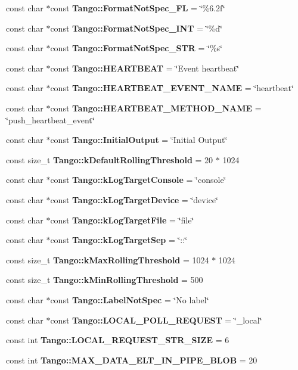 \begin{DoxyCompactItemize}
\item 
const char $\ast$const {\bf Tango\-::\-Format\-Not\-Spec\-\_\-\-F\-L} = \char`\"{}\%6.\-2f\char`\"{}
\item 
const char $\ast$const {\bf Tango\-::\-Format\-Not\-Spec\-\_\-\-I\-N\-T} = \char`\"{}\%d\char`\"{}
\item 
const char $\ast$const {\bf Tango\-::\-Format\-Not\-Spec\-\_\-\-S\-T\-R} = \char`\"{}\%s\char`\"{}
\item 
const char $\ast$const {\bf Tango\-::\-H\-E\-A\-R\-T\-B\-E\-A\-T} = \char`\"{}Event heartbeat\char`\"{}
\item 
const char $\ast$const {\bf Tango\-::\-H\-E\-A\-R\-T\-B\-E\-A\-T\-\_\-\-E\-V\-E\-N\-T\-\_\-\-N\-A\-M\-E} = \char`\"{}heartbeat\char`\"{}
\item 
const char $\ast$const {\bf Tango\-::\-H\-E\-A\-R\-T\-B\-E\-A\-T\-\_\-\-M\-E\-T\-H\-O\-D\-\_\-\-N\-A\-M\-E} = \char`\"{}push\-\_\-heartbeat\-\_\-event\char`\"{}
\item 
const char $\ast$const {\bf Tango\-::\-Initial\-Output} = \char`\"{}Initial Output\char`\"{}
\item 
const size\-\_\-t {\bf Tango\-::k\-Default\-Rolling\-Threshold} = 20 $\ast$ 1024
\item 
const char $\ast$const {\bf Tango\-::k\-Log\-Target\-Console} = \char`\"{}console\char`\"{}
\item 
const char $\ast$const {\bf Tango\-::k\-Log\-Target\-Device} = \char`\"{}device\char`\"{}
\item 
const char $\ast$const {\bf Tango\-::k\-Log\-Target\-File} = \char`\"{}file\char`\"{}
\item 
const char $\ast$const {\bf Tango\-::k\-Log\-Target\-Sep} = \char`\"{}\-::\char`\"{}
\item 
const size\-\_\-t {\bf Tango\-::k\-Max\-Rolling\-Threshold} = 1024 $\ast$ 1024
\item 
const size\-\_\-t {\bf Tango\-::k\-Min\-Rolling\-Threshold} = 500
\item 
const char $\ast$const {\bf Tango\-::\-Label\-Not\-Spec} = \char`\"{}No label\char`\"{}
\item 
const char $\ast$const {\bf Tango\-::\-L\-O\-C\-A\-L\-\_\-\-P\-O\-L\-L\-\_\-\-R\-E\-Q\-U\-E\-S\-T} = \char`\"{}\-\_\-local\char`\"{}
\item 
const int {\bf Tango\-::\-L\-O\-C\-A\-L\-\_\-\-R\-E\-Q\-U\-E\-S\-T\-\_\-\-S\-T\-R\-\_\-\-S\-I\-Z\-E} = 6
\item 
const int {\bf Tango\-::\-M\-A\-X\-\_\-\-D\-A\-T\-A\-\_\-\-E\-L\-T\-\_\-\-I\-N\-\_\-\-P\-I\-P\-E\-\_\-\-B\-L\-O\-B} = 20

\end{DoxyCompactItemize}
